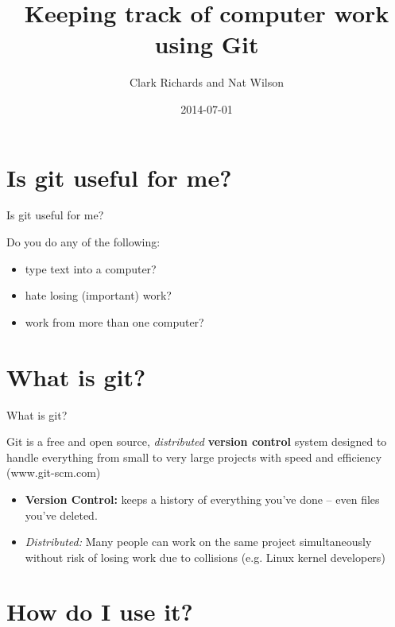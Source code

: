 \documentclass{beamer}
\title[Git MTM] %
{Keeping track of computer work using Git}
\subtitle
{}
\author
{Clark Richards and Nat Wilson}
\date%
{2014-07-01}
\begin{document}
\begin{frame}
  \titlepage
\end{frame}



\section{Is git useful for me?}

\begin{frame}{Is git useful for me?}

Do you do any of the following:
\begin{itemize}
\item<1-3> type text into a computer?
\item<2-3> hate losing (important) work?
\item<3> work from more than one computer?
\end{itemize}

\end{frame}

\section{What is git?}

\begin{frame}{What is git?}

  Git is a free and open source, {\it distributed} {\bf version
    control} system designed to handle everything from small to very
  large projects with speed and efficiency (www.git-scm.com)
  \vspace{2em}
  \begin{itemize}
  \item {\bf Version Control:} keeps a history of everything you've
    done -- even files you've deleted.
  \item {\it Distributed:} Many people can work on the same project
    simultaneously without risk of losing work due to collisions
    (e.g. Linux kernel developers)
  \end{itemize}
\end{frame}

\section{How do I use it?}
\end{document}
